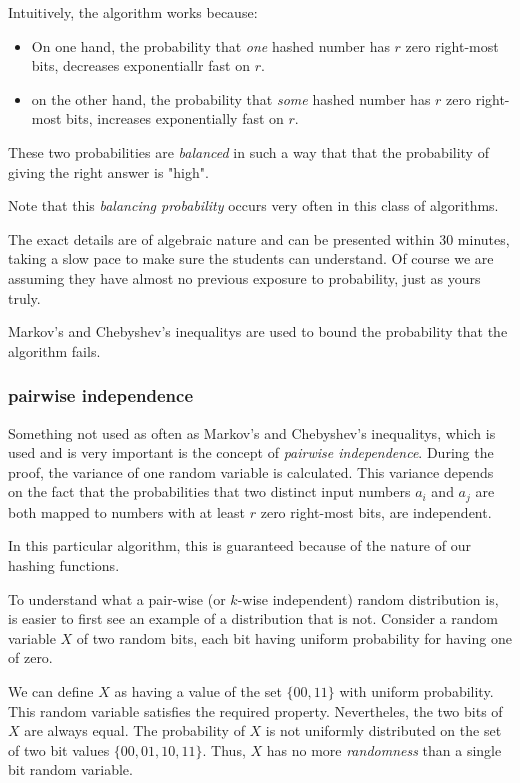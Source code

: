 \documentclass[12pt]{article}
\begin{document}
Intuitively, the algorithm works because:
\begin{itemize}
\item On one hand, the probability that \emph{one} hashed number has $r$ zero right-most  bits, decreases exponentiallr fast on $r$.
\item on the other hand, the probability that \emph{some} hashed number has $r$ zero right-most bits, increases exponentially fast on $r$.
\end{itemize}
These two probabilities are \emph{balanced} in such a way that that the probability of giving the right answer is "high".

Note that this \emph{balancing probability} occurs very often in this class of algorithms.

The exact details are of algebraic nature and can be presented within 30 minutes, taking a slow pace to make sure the students can understand. Of course we are assuming they have almost no previous exposure to probability, just as yours truly.

Markov's and Chebyshev's inequalitys are used to bound the probability that the algorithm fails.

\subsubsection{pairwise independence}

Something not used as often as Markov's and Chebyshev's inequalitys, which is used and is very important 
is the concept of \emph{pairwise independence}. During the proof, the variance of one random variable is calculated. 
This variance depends on the fact that the probabilities that two distinct input numbers $a_i$ and $a_j$ are both mapped to numbers with at least $r$ zero right-most bits, are independent.

In this particular algorithm, this is guaranteed because of the nature of our hashing functions.

To understand what a pair-wise (or $k$-wise independent)  random distribution is, is easier to first see an example of a distribution that is not. 
Consider a  random variable $X$ of two random bits, each bit having uniform probability for having one of zero.

We can define $X$ as having a value of the set $\{00,11\}$ with uniform probability. This random variable satisfies the required property. Nevertheles, the two bits of $X$ are always equal. The probability of $X$ is not uniformly distributed on the set of two bit values $\{00,01,10,11\}$.
Thus, $X$ has no more \emph{randomness} than a single bit random variable.
\end{document}
